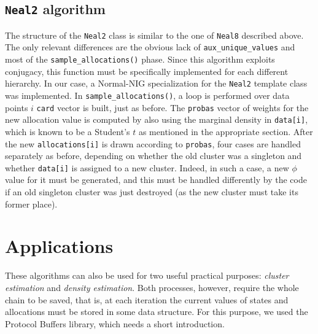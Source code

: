 \subsection{\texttt{Neal2} algorithm} %
The structure of the \verb|Neal2| class is similar to the one of \verb|Neal8| described above.
The only relevant differences are the obvious lack of \verb|aux_unique_values| and most of the \verb|sample_allocations()| phase.
Since this algorithm exploits conjugacy, this function must be specifically implemented for each different hierarchy.
In our case, a Normal-NIG specialization for the \verb|Neal2| template class was implemented.
In \verb|sample_allocations()|, a loop is performed over data points $i$ \verb|card| vector is built, just as before.
The \verb|probas| vector of weights for the new allocation value is computed by also using the marginal density in \verb|data[i]|, which is known to be a Student's $t$ as mentioned in the appropriate section.
After the new \verb|allocations[i]| is drawn according to \verb|probas|, four cases are handled separately as before, depending on whether the old cluster was a singleton and whether \verb|data[i]| is assigned to a new cluster.
Indeed, in such a case, a new $\phi$ value for it must be generated, and this must be handled differently by the code if an old singleton cluster was just destroyed (as the new cluster must take its former place).

\section{Applications}
These algorithms can also be used for two useful practical purposes: \emph{cluster estimation} and \emph{density estimation}.
Both processes, however, require the whole chain to be saved, that is, at each iteration the current values of states and allocations must be stored in some data structure.
For this purpose, we used the Protocol Buffers library, which needs a short introduction.

